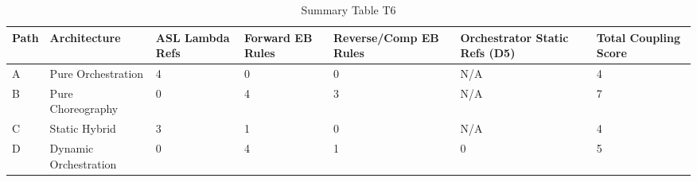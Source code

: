\begin{table}[htbp]
\centering
\caption{Summary Table T6}
\label{tab:t6}
\begin{tabular}{lllllll}
\toprule
Path & Architecture & ASL Lambda Refs & Forward EB Rules & Reverse/Comp EB Rules & Orchestrator Static Refs (D5) & Total Coupling Score \\
\midrule
A & Pure Orchestration & 4 & 0 & 0 & N/A & 4 \\
B & Pure Choreography & 0 & 4 & 3 & N/A & 7 \\
C & Static Hybrid & 3 & 1 & 0 & N/A & 4 \\
D & Dynamic Orchestration & 0 & 4 & 1 & 0 & 5 \\
\bottomrule
\end{tabular}
\end{table}
